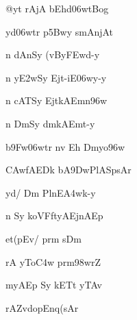 \dnnemslokac 
{\dn {}@y\?t rAjA bEhd\0\306wtBog\4}
\dontdisplaylinenum

\dnnemslokad 
{\dn yd\306wtr\2 p\35Bwy smAnjAt \vegdn\dontdisplaylinenum}


\ujvers\dnnemsloka 
{\dn n dAnSy\2 (vBy\3FEwd-y}
\dontdisplaylinenum

\dnnemslokab 
{\dn n y\3E2wSy\2 Ejt{\rs -\re}iE\306wy-y \dandadn\dontdisplaylinenum}

\dnnemslokac 
{\dn n cAT\0Sy\2 EjtkAEmn\396w}
\dontdisplaylinenum

\dnnemslokad 
{\dn n Dm\0Sy\2 dmkAEmt-y \vegdn\dontdisplaylinenum}


\ujvers\dnnemsloka 
{\dn b\39Fw\306wtr\2 n\4v Eh Dm\0yo\396w}
\dontdisplaylinenum

\dnnemslokab 
{\dn \3CAw\?fAEDk\2 bA\39DwPlASpsAr \dandadn\dontdisplaylinenum}

\dnnemslokac 
{\dn yd/ Dm{\rdt} Pln\4E\3A4wk-y}
\dontdisplaylinenum

\dnnemslokad 
{\dn n Sy koVFftyAEjnAEp \vegdn\dontdisplaylinenum}


\ujvers\dnnemsloka 
{\dn et(pEv/\2 prm\2 sDm\0}
\dontdisplaylinenum

\dnnemslokab 
{\dn {}rA yTo\3C4w\2 prm\?\398wr\?Z \dandadn\dontdisplaylinenum}

\dnnemslokac 
{\dn myAEp Sy\2 kETt\2 yTAv}
\dontdisplaylinenum

\dnnemslokad 
{\dn {}rAZv\?dopEnq(sAr \vegdn\dontdisplaylinenum}


